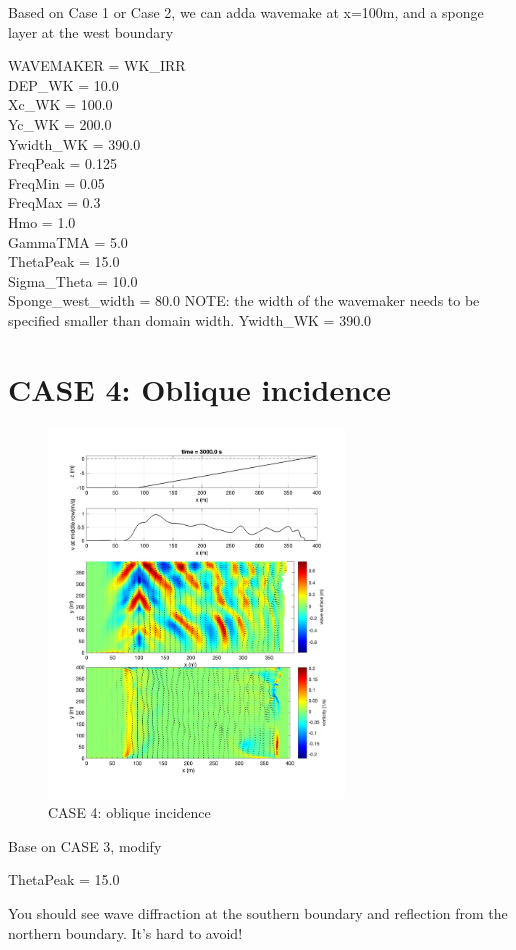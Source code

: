 \documentclass[preprint,10pt]{elsarticle}
\begin{document}
 Based on Case 1 or Case 2, we can adda wavemake at x=100m, and a sponge layer at the west boundary
 
 \noindent
 WAVEMAKER = WK\_IRR \\
DEP\_WK = 10.0  \\
Xc\_WK = 100.0  \\
Yc\_WK = 200.0  \\
Ywidth\_WK = 390.0 \\
FreqPeak = 0.125  \\
FreqMin = 0.05 \\
FreqMax = 0.3  \\
Hmo = 1.0  \\
GammaTMA = 5.0 \\ 
ThetaPeak = 15.0  \\
Sigma\_Theta = 10.0  \\
 
 \noindent
Sponge\_west\_width =  80.0  
 NOTE: the width of the wavemaker needs to be specified smaller than domain width. Ywidth\_WK = 390.0 
 
 \newpage
 
   \newpage
\section*{CASE 4: Oblique incidence}
 
  \begin{figure}
\begin{center}
 \includegraphics[width=0.7\textwidth]{../TEST_couplingbc_wavemaker/postprocessing/case_slope_wave_15deg.jpg}
 \caption{CASE 4: oblique incidence}
 \label{v2}
 \end{center}
 \end{figure}

Base on CASE 3, modify 

ThetaPeak = 15.0  

You should see wave diffraction at the southern boundary and reflection from the northern boundary. It's hard to avoid!
  
\end{document}
